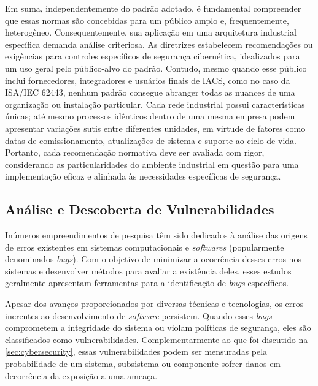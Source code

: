         Em suma, independentemente do padrão adotado, é fundamental compreender que essas normas são concebidas para um público amplo e, frequentemente, heterogêneo. Consequentemente, sua aplicação em uma arquitetura industrial específica demanda análise criteriosa. As diretrizes estabelecem recomendações ou exigências para controles específicos de segurança cibernética, idealizados para um uso geral pelo público-alvo do padrão. Contudo, mesmo quando esse público inclui fornecedores, integradores e usuários finais de IACS, como no caso da ISA/IEC 62443, nenhum padrão consegue abranger todas as nuances de uma organização ou instalação particular. Cada rede industrial possui características únicas; até mesmo processos idênticos dentro de uma mesma empresa podem apresentar variações sutis entre diferentes unidades, em virtude de fatores como datas de comissionamento, atualizações de sistema e suporte ao ciclo de vida. Portanto, cada recomendação normativa deve ser avaliada com rigor, considerando as particularidades do ambiente industrial em questão para uma implementação eficaz e alinhada às necessidades específicas de segurança.

    \subsection{Análise e Descoberta de Vulnerabilidades} \label{subsec:analVul}

        Inúmeros empreendimentos de pesquisa têm sido dedicados à análise das origens de erros existentes em sistemas computacionais e \textit{softwares} (popularmente denominados \textit{bugs}). Com o objetivo de minimizar a ocorrência desses erros nos sistemas e desenvolver métodos para avaliar a existência deles, esses estudos geralmente apresentam ferramentas para a identificação de \textit{bugs} específicos.

        Apesar dos avanços proporcionados por diversas técnicas e tecnologias, os erros inerentes ao desenvolvimento de \textit{software} persistem. Quando esses \textit{bugs} comprometem a integridade do sistema ou violam políticas de segurança, eles são classificados como vulnerabilidades. Complementarmente ao que foi discutido na \autoref{sec:cybersecurity}, essas vulnerabilidades podem ser mensuradas pela probabilidade de um sistema, subsistema ou componente sofrer danos em decorrência da exposição a uma ameaça.
    
